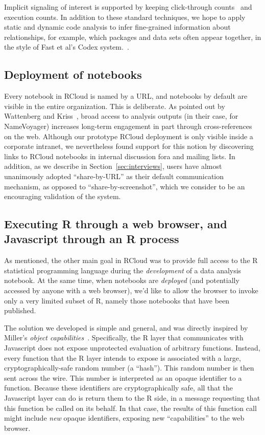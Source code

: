 Implicit signaling of interest is supported by keeping click-through
counts~\cite{Joachims:2005:AIC} and execution counts. In addition to
these standard techniques, we hope to apply static and dynamic code
analysis to infer fine-grained information about relationships,
for example, which packages and data sets often appear together,
in the style of Fast et al's Codex system.~\cite{Fast:2014:ECS}.

\subsection{Deployment of notebooks\label{sec:deployment}}

Every notebook in RCloud is named by a URL, and notebooks by default
are visible in the entire organization. This is deliberate.
As pointed out by Wattenberg and Kriss~\cite{Wattenberg:2011:DFS},
broad access to analysis outputs (in their case, for NameVoyager) increases
long-term engagement in part through cross-references on the
web. Although our prototype RCloud deployment is only visible inside a
corporate intranet, we nevertheless found support for this notion by
discovering links to RCloud notebooks in internal discussion fora and
mailing lists. In addition, as we describe in
Section~\ref{sec:interviews}, users have almost unanimously adopted
``share-by-URL'' as their default communication mechanism, as opposed
to ``share-by-screenshot'', which we consider to be an encouraging
validation of the system.

\subsection{Executing R through a web browser, and Javascript through an R process\label{sec:Rinbrowser}}

As mentioned, the other main goal in RCloud was to provide
full access to the R statistical programming language during the
\emph{development} of a data analysis notebook.
At the same time, when notebooks are \emph{deployed} (and potentially
accessed by anyone with a web browser), we'd like to allow the
browser to invoke only a very limited subset of R, namely those
notebooks that have been published.

The solution we developed is simple and general, and was directly
inspired by Miller's \emph{object
  capabilities}~\cite{Miller:2006:RCT}. Specifically, the R layer that
communicates with Javascript does not expose unprotected evaluation of
arbitrary functions. Instead, every function that the R layer intends
to expose is associated with a large, cryptographically-safe random
number (a ``hash''). This random number is then sent
across the wire. This number is interpreted as an opaque identifier to
a function. Because these identifiers are cryptographically safe, all
that the Javascript layer can do is return them to the R side, in a
message requesting that this function be called on its behalf. In that
case, the results of this function call might include \emph{new}
opaque identifiers, exposing new ``capabilities'' to the web browser.

